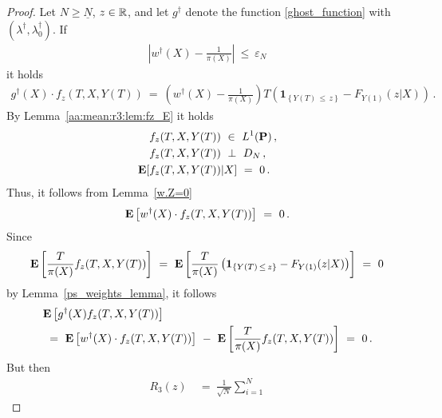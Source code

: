 \begin{proof}
  Let $N\ge\underline{N}$,
  $z\in\mathbb{R}$,
  and 
  let
  $g^\dagger$ 
  denote the function \eqref{ghost_function} with 
  $
(\lambda^\dagger,\lambda_0^\dagger)
  $.
  If
  \begin{gather*}
    \left| 
    w^\dagger(X)- \frac{1}{\pi(X)} 
    \right|
    \ 
    \le
    \ 
    \varepsilon_N
  \end{gather*}
  it holds
  \begin{gather*}
    g^\dagger
    (X)
    \cdot
    f_z
    (T,X,Y(T))
    \ 
    =
    \ 
  \left( 
      w^\dagger(X)
      -
      \frac{1}{\pi(X)}
  \right)
      T
      \left( 
        \mathbf{1}
        _{\left\{  Y(T)\,\le\,z \right\}}
        -
        F_{Y(1)}(z|X)
      \right)
      \,.
  \end{gather*}
  By Lemma~\ref{aa:mean:r3:lem:fz_E}
  it holds 
  \begin{align*}
    &
  f_z(T,X,Y(T))
  \ 
  \in
  \ 
  L^1(\P)\,, 
  \\
  &
  f_z(T,X,Y(T))
  \ 
  \perp
  \ 
  D_N
  \,,
  \\
  \E
  [
  &
  f_z(T,X,Y(T))
    |X
  ]
  \ 
  =
  \ 
  0
  \,.
  \end{align*}
  Thus, 
  it follows from Lemma~\ref{w.Z=0}
  \begin{gather*}
    \E
    \left[
      w^\dagger(X)
      \cdot
      f_z(T,X,Y(T))
    \right]
    \ 
    =
    \ 
    0
    \,.
  \end{gather*}
  Since
  \begin{gather*}
    \E
    \left[
      \frac{T}{\pi(X)}
      f_z(T,X,Y(T))
    \right]
    \ 
    =
    \ 
    \E
    \left[
      \frac{T}{\pi(X)}
      \left( 
        \mathbf{1}
        _{\left\{  Y(T)\,\le\,z \right\}}
        -
        F_{Y(1)}(z|X)
      \right)
    \right]
    \  
    =
    \ 
    0
  \end{gather*}
  by Lemma~\ref{ps_weights_lemma},
  it follows
  \begin{align*}
    &
  \E
  \left[
    g^\dagger(X)
    f_z(T,X,Y(T))
  \right]
  \\
    &
  \ 
  =
  \ 
    \E
    \left[
      w^\dagger(X)
      \cdot
      f_z(T,X,Y(T))
    \right]
    \ 
    -
    \ 
    \E
    \left[
      \frac{T}{\pi(X)}
      f_z(T,X,Y(T))
    \right]
    \ 
    =
    \ 
  0
  \,.
  \end{align*}
  But then 
  \begin{align*}
    R_3(z)
    &
    \ 
    =
    \ 
  \frac{1}
  {
\sqrt{N}
  }
    \sum_{i=1}^{N} 

\end{align*}
\end{proof}
